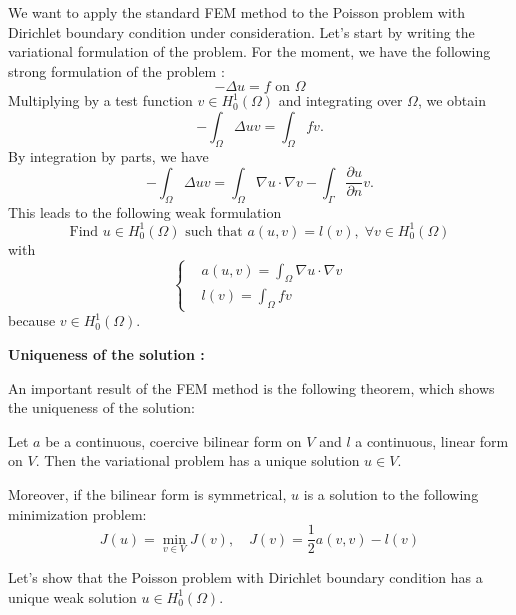 We want to apply the standard FEM method to the Poisson problem with Dirichlet boundary condition under consideration. Let's start by writing the variational formulation of the problem. For the moment, we have the following strong formulation of the problem :
\begin{equation*}
	-\Delta u = f \text{ on } \Omega
\end{equation*}
Multiplying by a test function $v\in H_0^1(\Omega)$ and integrating over $\Omega$, we obtain
\begin{equation*}
	-\int_\Omega \Delta u v = \int_\Omega f v.
\end{equation*}
By integration by parts, we have
\begin{equation*}
	-\int_\Omega \Delta u v = \int_\Omega \nabla u\cdot\nabla v-\int_\Gamma \frac{\partial u}{\partial n}v.
\end{equation*}
This leads to the following weak formulation
\begin{equation*}
		\text{Find } u\in H_0^1(\Omega) \text{ such that } a(u,v)=l(v), \;\forall v\in H_0^1(\Omega)
\end{equation*}
with
\begin{equation*}
	\left\{\begin{aligned}
		&a(u,v) = \int_\Omega \nabla u\cdot\nabla v \\
		&l(v) = \int_\Omega f v
	\end{aligned}\right.
\end{equation*}
because $v\in H_0^1(\Omega)$.

\newpage

\textbf{Uniqueness of the solution :}

An important result of the FEM method is the following theorem, which shows the uniqueness of the solution:

\begin{Prop}
	
	Let $a$ be a continuous, coercive bilinear form on $V$ and $l$ a continuous, linear form on $V$. Then the variational problem has a unique solution $u\in V$. 
	
	Moreover, if the bilinear form is symmetrical, $u$ is a solution to the following minimization problem:
	\begin{equation*}
		J(u)=\min_{v\in V} J(v), \quad J(v)=\frac{1}{2}a(v,v)-l(v)
	\end{equation*}
\end{Prop}

Let's show that the Poisson problem with Dirichlet boundary condition has a unique weak solution $u\in H_0^1(\Omega)$. 

